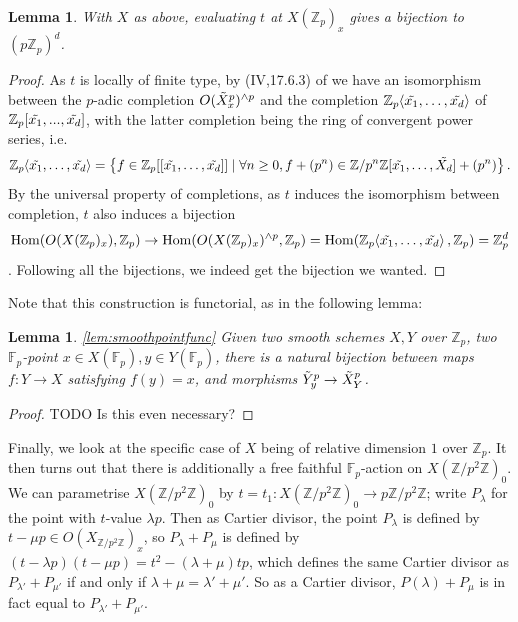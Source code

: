 \documentclass{article}
\newcommand{\Z}{\mathbb{Z}}
\newcommand{\F}{\mathbb{F}}
\renewcommand{\angle}[1]{\hspace{-2pt}\left\langle #1 \right\rangle}
\DeclareMathOperator{\Hom}{Hom}
\theoremstyle{plain}
\newtheorem{lem}[thm]{Lemma} %
\theoremstyle{definition}
\theoremstyle{remark}
\begin{document}
\begin{lem}
With $X$ as above, evaluating $t$ at $X(\Z_p)_x$ gives a bijection to $(p\Z_p)^d$.
\end{lem}
\begin{proof}
As $t$ is locally of finite type, by (IV,17.6.3) of \cite{ega} we have an isomorphism between the $p$-adic completion $O(\Tilde{X}_x^p)^{\wedge p}$ and the completion $\Z_p\angle{\Tilde{x_1},\dots, \Tilde{x_d}}$ of $\Z_p[\Tilde{x_1},...,\Tilde{x_d}]$, with the latter completion being the ring of convergent power series, i.e.
\[
\Z_p\angle{\Tilde{x_1},\dots, \Tilde{x_d}} = \left\{f \in \Z_p[[\Tilde{x_1},\dots,\Tilde{x_d}]] \mid \forall n \geq 0, f + (p^n) \in \Z/p^n\Z[\Tilde{x_1},\dots,\tilde{X_d}] + (p^n) \right\}.
\]
By the universal property of completions, as $t$ induces the isomorphism between completion, $t$ also induces a bijection $$\Hom(O(X(\Z_p)_x), \Z_p) \to \Hom(O(X(\Z_p)_x)^{\wedge p}, \Z_p) = \Hom(\Z_p\angle{\Tilde{x_1},\dots,\Tilde{x_d}},\Z_p) = \Z_p^d$$. Following all the bijections, we indeed get the bijection we wanted.
\end{proof}

Note that this construction is functorial, as in the following lemma:
\begin{lem}
\ref{lem:smoothpointfunc}
Given two smooth schemes $X,Y$ over $\Z_p$, two $\F_p$-point $x\in X(\F_p), y\in Y(\F_p)$, there is a natural bijection between maps $f: Y \to X$ satisfying $f(y) = x$, and morphisms $\Tilde{Y}_y^p \to \Tilde{X}_Y^p$. 
\end{lem}
\begin{proof}
TODO
Is this even necessary?
\end{proof}

Finally, we look at the specific case of $X$ being of relative dimension $1$ over $\Z_p$. It then turns out that there is additionally a free faithful $\F_p$-action on $X(\Z/p^2\Z)_0$. We can parametrise $X(\Z/p^2\Z)_0$ by $t = t_1 : X(\Z/p^2\Z)_0 \to p\Z/p^2\Z$; write $P_{\lambda}$ for the point with $t$-value $\lambda p$. Then as Cartier divisor, the point $P_{\lambda}$ is defined by $t - \mu p \in O(X_{\Z/p^2\Z})_x$, so $P_{\lambda} + P_{\mu}$ is defined by $(t-\lambda p)(t-\mu p) = t^2 - (\lambda + \mu)tp$, which defines the same Cartier divisor as $P_{\lambda'} + P_{\mu'}$ if and only if $\lambda + \mu = \lambda' + \mu'$. So as a Cartier divisor, $P(\lambda) + P_{\mu}$ is in fact equal to $P_{\lambda'} + P_{\mu'}$.
\end{document}
